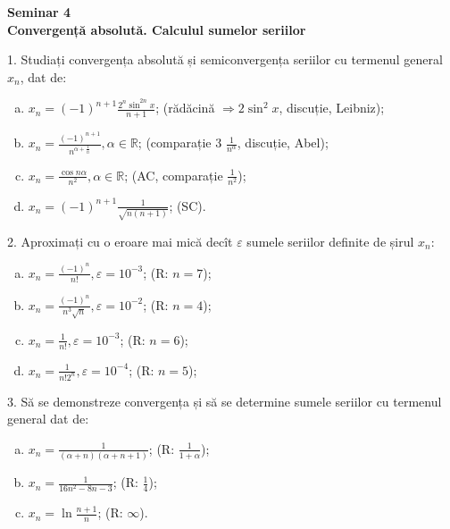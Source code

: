 \documentclass[11pt,a4paper]{article}
\newcommand\RR{\mathbb{R}}
\theoremstyle{dotless}
\theoremstyle{dotlessdr}
\begin{document}
\begin{center}
  {\large \textbf{Seminar 4 \\ Convergență absolută. Calculul sumelor seriilor}}
\end{center}

\vspace{1cm}

1. Studiați convergența absolută și semiconvergența seriilor cu termenul general $x_n$, dat de:
\begin{enumerate}[(a)]
\item $x_n = (-1)^{n+1} \frac{2^n \sin^{2n} x}{n + 1}$;
  \hfill (rădăcină $\Rightarrow 2 \sin^2 x$, discuție, Leibniz);
\item $x_n = \frac{(-1)^{n+1}}{n^{\alpha + \frac{1}{n}}}, \alpha \in \RR$;
  \hfill (comparație 3 $\frac{1}{n^\alpha}$, discuție, Abel);
\item $x_n = \frac{\cos n\alpha}{n^2}, \alpha \in \RR$; \hfill (AC, comparație $\frac{1}{n^2}$);
\item $x_n = (-1)^{n+1} \frac{1}{\sqrt{n(n+1)}}$; \hfill (SC).
\end{enumerate}

\vspace{1cm}

2. Aproximați cu o eroare mai mică decît $\varepsilon$ sumele seriilor definite de
șirul $x_n$:
\begin{enumerate}[(a)]
\item $x_n = \frac{(-1)^n}{n!}, \varepsilon = 10^{-3}$; \hfill (R: $n = 7$);
\item $x_n = \frac{(-1)^n}{n^3 \sqrt{n}}, \varepsilon = 10^{-2}$; \hfill (R: $n = 4$);
\item $x_n = \frac{1}{n!}, \varepsilon = 10^{-3}$; \hfill (R: $n = 6$);
\item $x_n = \frac{1}{n! 2^n}, \varepsilon = 10^{-4}$; \hfill (R: $n = 5$);
\end{enumerate}

\vspace{1cm}

3. Să se demonstreze convergența și să se determine sumele seriilor cu termenul general dat de:
\begin{enumerate}[(a)]
\item $x_n = \frac{1}{(\alpha + n)(\alpha + n + 1)}$; \hfill (R: $\frac{1}{1 + \alpha}$);
\item $x_n = \frac{1}{16n^2 - 8n - 3}$; \hfill (R: $\frac{1}{4}$);
\item $x_n = \ln \frac{n+1}{n}$; \hfill (R: $\infty$).
\end{enumerate}
\end{document}
